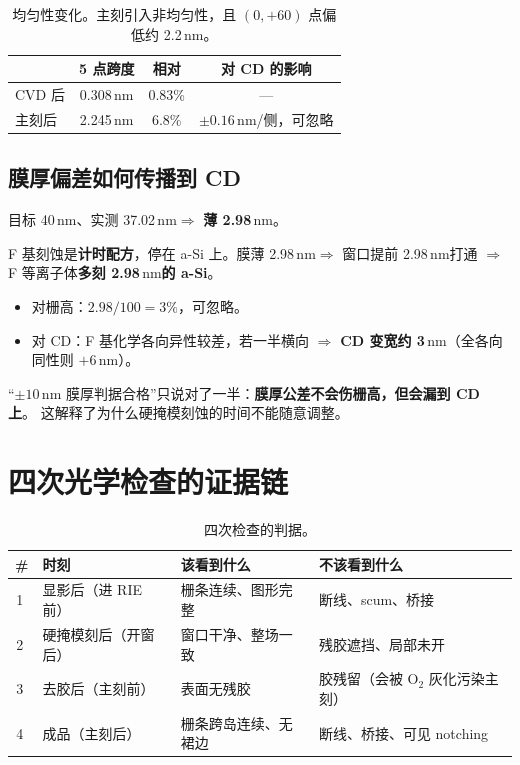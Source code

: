 \documentclass[UTF8,a4paper,11pt,fontset=windows]{ctexart}
\newcommand{\nm}{\ensuremath{\,\mathrm{nm}}}
\begin{document}
\begin{table}[h]
\centering
\small
\begin{tabular}{@{}lccc@{}}
\toprule
 & \textbf{5 点跨度} & \textbf{相对} & \textbf{对 CD 的影响} \\
\midrule
CVD 后   & 0.308\nm & 0.83\% & \multicolumn{1}{c}{—} \\
主刻后   & 2.245\nm & 6.8\%  & $\pm0.16\nm$/侧，可忽略 \\
\bottomrule
\end{tabular}
\caption{均匀性变化。主刻引入非均匀性，且 $(0,+60)$ 点偏低约 2.2\nm。}
\end{table}

\subsection{膜厚偏差如何传播到 CD}

目标 40\nm、实测 37.02\nm $\Rightarrow$ \textbf{薄 2.98\nm}。

F 基刻蚀是\textbf{计时配方}，停在 a-Si 上。膜薄 2.98\nm $\Rightarrow$ 窗口提前 2.98\nm 打通
$\Rightarrow$ F 等离子体\textbf{多刻 2.98\nm 的 a-Si}。

\begin{itemize}
  \item 对栅高：$2.98/100 = 3\%$，可忽略。
  \item 对 CD：F 基化学各向异性较差，若一半横向 $\Rightarrow$ \textbf{CD 变宽约 3\nm}（全各向同性则 $+6\nm$）。
\end{itemize}

\begin{warnbox}[容易被忽略的耦合]
“$\pm10\nm$ 膜厚判据合格”只说对了一半：\textbf{膜厚公差不会伤栅高，但会漏到 CD 上}。
这解释了为什么硬掩模刻蚀的时间不能随意调整。
\end{warnbox}

\section{四次光学检查的证据链}

\begin{table}[h]
\centering
\small
\begin{tabularx}{\textwidth}{@{}c >{\raggedright\arraybackslash}p{2.6cm} >{\raggedright\arraybackslash}p{5.4cm} X@{}}
\toprule
\textbf{\#} & \textbf{时刻} & \textbf{该看到什么} & \textbf{不该看到什么} \\
\midrule
\textcircled{1} & 显影后（进 RIE 前） & 栅条连续、图形完整 & 断线、scum、桥接 \\
\textcircled{2} & 硬掩模刻后（开窗后） & 窗口干净、整场一致 & 残胶遮挡、局部未开 \\
\textcircled{3} & 去胶后（主刻前） & 表面无残胶 & 胶残留（会被 O$_2$ 灰化污染主刻） \\
\textcircled{4} & 成品（主刻后） & 栅条跨岛连续、无裙边 & 断线、桥接、可见 notching \\
\bottomrule
\end{tabularx}
\caption{四次检查的判据。}
\end{table}
\end{document}
